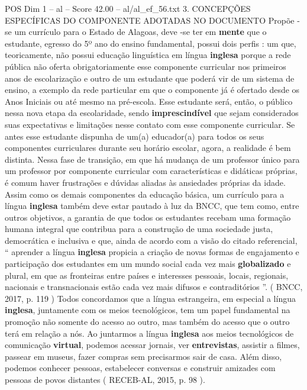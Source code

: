 \begin{textsample}{POS Dim 1 – al – Score 42.00 – al/al\_ef\_56.txt}  \label{ex:f1_pos_156}
3.
CONCEPÇÕES ESPECÍFICAS DO COMPONENTE ADOTADAS NO DOCUMENTO Propõe -se um currículo para o Estado de Alagoas, deve -se ter em \textbf{mente} que o estudante, egresso do 5º ano do ensino fundamental, possui dois perfis : um que, teoricamente, não possui educação linguística em língua \textbf{inglesa} porque a rede pública não oferta obrigatoriamente esse componente curricular nos primeiros anos de escolarização e outro de um estudante que poderá vir de um sistema de ensino, a exemplo da rede particular em que o componente já é ofertado desde os Anos Iniciais ou até mesmo na pré-escola.
Esse estudante será, então, o público nessa nova etapa da escolaridade, sendo \textbf{imprescindível} que sejam considerados suas expectativas e limitações nesse contato com esse componente curricular.
Se antes esse estudante dispunha de um(a) educador(a) para todos os seus componentes curriculares durante seu horário escolar, agora, a realidade é bem distinta.
Nessa fase de transição, em que há mudança de um professor único para um professor por componente curricular com características e didáticas próprias, é comum haver frustrações e dúvidas aliadas às ansiedades próprias da idade.
Assim como os demais componentes da educação básica, um currículo para a língua \textbf{inglesa} também deve estar pautado à luz da BNCC, que tem como, entre outros objetivos, a garantia de que todos os estudantes recebam uma formação humana integral que contribua para a construção de uma sociedade justa, democrática e inclusiva e que, ainda de acordo com a visão do citado referencial, “ aprender a língua \textbf{inglesa} propicia a criação de novas formas de engajamento e participação dos estudantes em um mundo social cada vez mais \textbf{globalizado} e plural, em que as fronteiras entre países e interesses pessoais, locais, regionais, nacionais e transnacionais estão cada vez mais difusos e contraditórios ”. ( BNCC, 2017, p. 119 ) Todos concordamos que a língua estrangeira, em especial a língua \textbf{inglesa}, juntamente com os meios tecnológicos, tem um papel fundamental na promoção não somente do acesso ao outro, mas também do acesso que o outro terá em relação a nós.
Ao juntarmos a língua \textbf{inglesa} aos meios tecnológicos de comunicação \textbf{virtual}, podemos acessar jornais, ver \textbf{entrevistas}, assistir a filmes, passear em museus, fazer compras sem precisarmos sair de casa.
Além disso, podemos conhecer pessoas, estabelecer conversas e construir amizades com pessoas de povos distantes ( RECEB-AL, 2015, p. 98 ).

\end{textsample}
